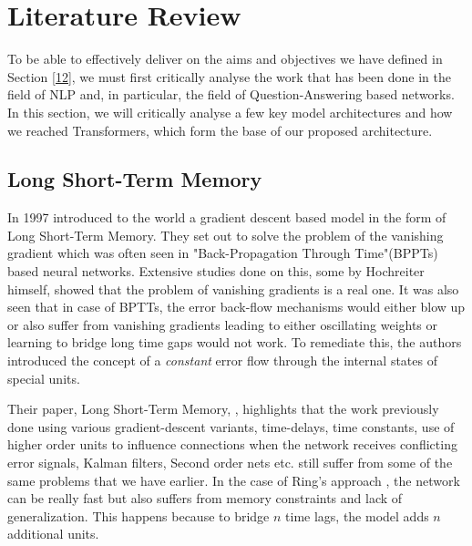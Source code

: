 \documentclass[a4paper,12pt]{report}
\begin{document}
    \chapter{\centering Literature Review}\label{c2litrev}

    To be able to effectively deliver on the aims and objectives we have defined in Section \ref{12}, we must first critically analyse the work that has been done in the field of NLP and, in particular, the field of Question-Answering based networks. In this section, we will critically analyse a few key model architectures and how we reached Transformers, which form the base of our proposed architecture.


        \section{Long Short-Term Memory}\label{22}

            In 1997 \cite{lstmoriginal} introduced to the world a gradient descent based model in the form of Long Short-Term Memory. They set out to solve the problem of the vanishing gradient which was often seen in "Back-Propagation Through Time"(BPPTs) based neural networks. Extensive studies done on this, some by Hochreiter himself, showed that the problem of vanishing gradients is a real one. It was also seen that in case of BPTTs, the error back-flow mechanisms would either blow up or also suffer from vanishing gradients leading to either oscillating weights or learning to bridge long time gaps would not work. To remediate this, the authors introduced the concept of a \textit{constant} error flow through the internal states of special units.

            Their paper, Long Short-Term Memory, \citep{lstmoriginal}, highlights that the work previously done using various gradient-descent variants, time-delays, time constants, use of higher order units to influence connections when the network receives conflicting error signals, Kalman filters, Second order nets etc. still suffer from some of the same problems that we have earlier. In the case of Ring's approach \citep{lstmRing}, the network can be really fast but also suffers from memory constraints and lack of generalization. This happens because to bridge $ n $ time lags, the model adds $ n $ additional units.
\end{document}
